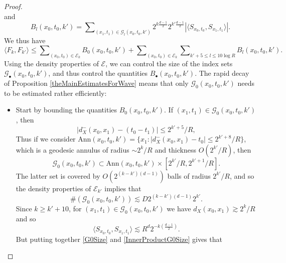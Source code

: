 \begin{proof}
\begin{equation}
\end{equation}
%
and
%
\begin{equation}
    B_l(x_0,t_0,k') = \sum\nolimits_{(x_1,t_1) \in \mathcal{G}_l(x_0,t_0,k')} 2^{k \frac{d-1}{2}} 2^{k' \frac{d-1}{2}} |\langle {S\!}_{x_0,t_0}, {S\!}_{x_1,t_1} \rangle|.
\end{equation}
%
We thus have
%
\begin{equation}
    \langle F_k, F_{k'} \rangle \leq \sum\nolimits_{(x_0,t_0) \in \mathcal{E}_k} B_0(x_0,t_0,k') + \sum\nolimits_{(x_0,t_0) \in \mathcal{E}_k} \sum\nolimits_{k' + 5 \leq l \leq 10 \log R} B_l(x_0,t_0,k').
\end{equation}
%
Using the density properties of $\mathcal{E}$, we can control the size of the index sets $\mathcal{G}_{\bullet}(x_0,t_0,k')$, and thus control the quantities $B_\bullet(x_0,t_0,k')$. The rapid decay of Proposition \ref{theMainEstimatesForWave} means that only $\mathcal{G}_0(x_0,t_0,k')$ needs to be estimated rather efficiently:
%
\begin{itemize}%
    \item Start by bounding the quantities $B_0(x_0,t_0,k')$. If $(x_1,t_1) \in \mathcal{G}_0(x_0,t_0,k')$, then
    \begin{equation}
        |d_X^-(x_0,x_1) - (t_0 - t_1)| \leq 2^{k'+5}/R,
    \end{equation}
    Thus if we consider $\text{Ann}(x_0,t_0,k') = \{ x_1: |d_X^-(x_0,x_1) - t_0| \leq 2^{k'+8}/R \}$, which is a geodesic annulus of radius $\sim 2^k / R$ and thickness $O(2^{k'}/R)$, then
    \begin{equation}
        \mathcal{G}_0(x_0,t_0,k') \subset \text{Ann}(x_0,t_0,k') \times [ 2^{k'}/R, 2^{k'+1}/R ].
    \end{equation}
    The latter set is covered by $O(2^{(k-k')(d-1)})$ balls of radius $2^{k'}/R$, and so the density properties of $\mathcal{E}_{k'}$ implies that
    \begin{equation} \label{G0Size}
        \#( \mathcal{G}_0(x_0,t_0,k') ) \lesssim D 2^{(k-k')(d-1)} 2^{k'}. 
    \end{equation}
    Since $k \geq k' + 10$, for $(x_1,t_1) \in \mathcal{G}_0(x_0,t_0,k')$ we have $d_X(x_0,x_1) \gtrsim 2^k / R$ and so
    \begin{equation} \label{InnerProductG0Size}
        \langle S\!_{x_0,t_0}, S\!_{x_1,t_1} \rangle \lesssim R^d 2^{-k \left( \frac{d-1}{2} \right)}.
    \end{equation}
    But putting together \eqref{G0Size} and \eqref{InnerProductG0Size} gives that

\end{itemize}
\end{proof}
